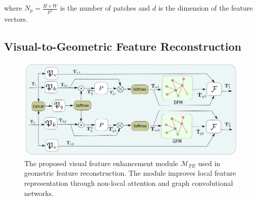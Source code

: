 \noindent where $N_p = \frac{H \times W}{p^2}$ is the number of patches and $d$ is the dimension of the feature vectors. 

\subsection*{Visual-to-Geometric Feature Reconstruction}

\begin{figure}[ht]
\centering
\includegraphics[width=0.8\linewidth]{figs/NL}
\caption{The proposed visual feature enhancement module $\mathcal{M}_{FE}$ used in geometric feature reconstruction. The module improves local feature representation through non-local attention and graph convolutional networks.}
\label{fig:NL}
\end{figure}

